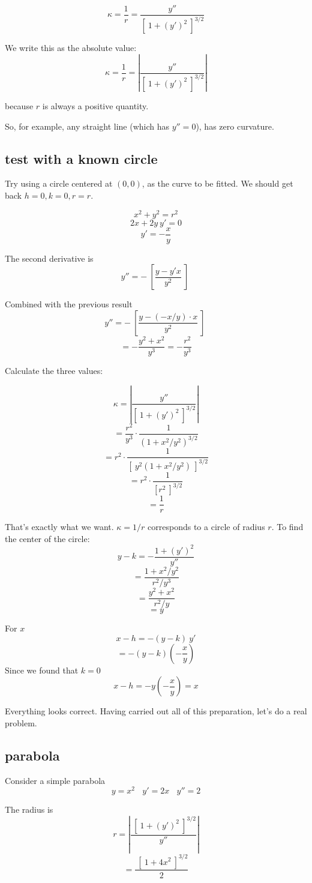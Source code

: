 \documentclass[11pt, oneside]{article}
\begin{document}
\[ \kappa = \frac{1}{r} = \frac{y''}{[ \ 1 + (y')^2 \ ]^{3/2}} \]

We write this as the absolute value:
\[ \kappa = \frac{1}{r} = | \frac{y''}{[ \ 1 + (y')^2 \ ]^{3/2}} | \]

because $r$ is always a positive quantity.

So, for example, any straight line (which has $y'' = 0$), has zero curvature.

\subsection*{test with a known circle}
Try using a circle centered at $(0,0)$, as the curve to be fitted.  We should get back $h=0, k=0, r=r$.

\[ x^2 + y^2 = r^2 \]
\[ 2x + 2y \ y' = 0 \]
\[ y' = -\frac{x}{y} \]

The second derivative is
\[ y'' = - \ [ \frac{y - y' x}{y^2} \ ] \ \]

Combined with the previous result
\[ y'' = - \ [ \frac{y - (-x/y) \cdot x}{y^2} \ ] \ \]
\[ = - \frac{y^2 + x^2}{y^3} = - \frac{r^2}{y^3} \]

Calculate the three values:

\[ \kappa = | \frac{y''}{[ \ 1 + (y')^2 \ ]^{3/2}} | \]
\[ = \frac{r^2}{y^3} \cdot \frac{1}{(1 + x^2/y^2)^{3/2}} \]
\[ = r^2 \cdot \frac{1}{[ \ y^2(1 + x^2/y^2) \ ]^{3/2}} \]
\[ = r^2 \cdot \frac{1}{[ r^2\ ]^{3/2}} \]
\[ = \frac{1}{r} \]

That's exactly what we want.  $\kappa = 1/r$ corresponds to a circle of radius $r$.  To find the center of the circle:
\[ y - k = - \frac{1 + (y')^2}{y''} \]
\[ = \frac{1 + x^2/y^2}{r^2/y^3} \]
\[ = \frac{y^2 + x^2}{r^2/y} \]
\[ = y \]

For $x$
\[ x - h = -(y - k)\ y' \]
\[ = -(y - k) (-\frac{x}{y}) \]
Since we found that $k = 0$
\[ x - h = -y(-\frac{x}{y}) = x \]

Everything looks correct.  Having carried out all of this preparation, let's do a real problem.

\subsection*{parabola}

Consider a simple parabola
\[ y = x^2 \ \ \ \ y' = 2x \ \ \ \  y'' = 2 \]

The radius is
\[  r =  | \frac{\ [ \ 1 + (y')^2 \ ]^{3/2}}{y''} | \]
\[ =  \frac{\ [ \ 1 + 4x^2 \ ]^{3/2}}{2} \]
\end{document}
